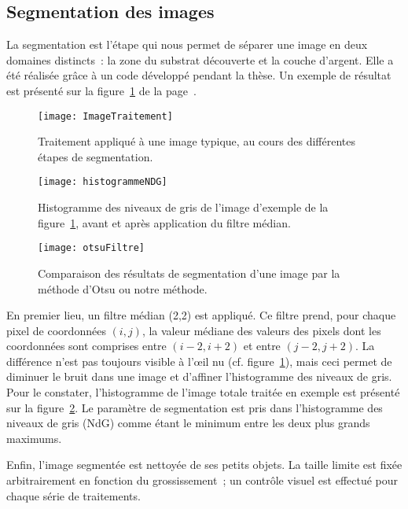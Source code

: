 	\subsection{Segmentation des images}
La segmentation est l'étape qui nous permet de séparer une image en deux domaines distincts~: la zone du substrat découverte et la couche d'argent. Elle a été réalisée grâce à un code développé pendant la thèse. Un exemple de résultat est présenté sur la figure~\ref{ImageTraitement} de la page~\pageref{ImageTraitement}.\par 
\begin{figure}[!p]
\centering
\texttt{[image: ImageTraitement]}
\caption{Traitement appliqué à une image typique, au cours des différentes étapes de segmentation.}
\label{ImageTraitement}
\end{figure}
\begin{figure}[!p]
\centering
\texttt{[image: histogrammeNDG]}
\caption{Histogramme des niveaux de gris de l'image d'exemple de la figure~\ref{ImageTraitement}, avant et après application du filtre médian.}
\label{histogrammeNDG}
\end{figure}
\begin{figure}[!p]
\centering
\texttt{[image: otsuFiltre]}
\caption{Comparaison des résultats de segmentation d'une image par la méthode d'Otsu ou notre méthode.}
\label{otsuFiltre}
\end{figure}
En premier lieu, un filtre médian (2,2) est appliqué. Ce filtre prend, pour chaque pixel de coordonnées $(i,j)$, la valeur médiane des valeurs des pixels dont les coordonnées sont comprises entre $(i-2,i+2)$ et entre $(j-2,j+2)$. La différence n'est pas toujours visible à l'œil nu (cf. figure~\ref{ImageTraitement}), mais ceci permet de diminuer le bruit dans une image et d'affiner l'histogramme des niveaux de gris. Pour le constater, l'histogramme de l'image totale traitée en exemple est présenté sur la figure~\ref{histogrammeNDG}. Le paramètre de segmentation est pris dans l'histogramme des niveaux de gris (NdG) comme étant le minimum entre les deux plus grands maximums.\par 
Enfin, l'image segmentée est nettoyée de ses petits objets. La taille limite est fixée arbitrairement en fonction du grossissement~; un contrôle visuel est effectué pour chaque série de traitements.\par 

